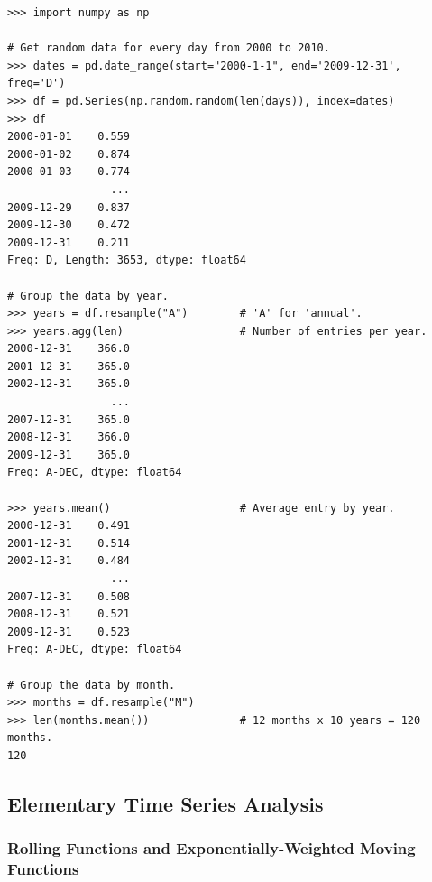 \begin{lstlisting}
>>> import numpy as np

# Get random data for every day from 2000 to 2010.
>>> dates = pd.date_range(start="2000-1-1", end='2009-12-31', freq='D')
>>> df = pd.Series(np.random.random(len(days)), index=dates)
>>> df
2000-01-01    0.559
2000-01-02    0.874
2000-01-03    0.774
                ...
2009-12-29    0.837
2009-12-30    0.472
2009-12-31    0.211
Freq: D, Length: 3653, dtype: float64

# Group the data by year.
>>> years = df.resample("A")        # 'A' for 'annual'.
>>> years.agg(len)                  # Number of entries per year.
2000-12-31    366.0
2001-12-31    365.0
2002-12-31    365.0
                ...
2007-12-31    365.0
2008-12-31    366.0
2009-12-31    365.0
Freq: A-DEC, dtype: float64

>>> years.mean()                    # Average entry by year.
2000-12-31    0.491
2001-12-31    0.514
2002-12-31    0.484
                ...
2007-12-31    0.508
2008-12-31    0.521
2009-12-31    0.523
Freq: A-DEC, dtype: float64

# Group the data by month.
>>> months = df.resample("M")
>>> len(months.mean())              # 12 months x 10 years = 120 months.
120
\end{lstlisting}

\subsection*{Elementary Time Series Analysis} %

\subsubsection*{Rolling Functions and Exponentially-Weighted Moving Functions}

